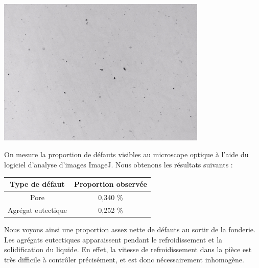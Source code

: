 \centerline{\includegraphics[width=0.75\textwidth]{images_optique/brut2.pdf}}

On mesure la proportion de défauts visibles au microscope optique à l'aide du 
logiciel d'analyse d'images ImageJ. Nous obtenons les résultats suivants : \\
\begin{center}
    \begin{tabular}{c|c}
        \textbf{Type de défaut}  & \textbf{Proportion observée}  \\
        \hline
        Pore               & 0,340 \% \\
        Agrégat eutectique & 0,252 \% \\
    \end{tabular}
\end{center}

Nous voyons ainsi une proportion assez nette de défauts au sortir de la fonderie. 
Les agrégats eutectiques apparaissent pendant le refroidissement 
et la solidification du liquide. En effet, la vitesse de refroidissement dans 
la pièce est très difficile à contrôler précisément, et est donc nécessairement
inhomogène.

